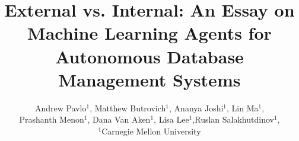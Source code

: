 \documentclass[11pt,times]{article}
\begin{document}
\newcommand{\mail}[1]{\href{mailto:#1}{#1}}

\title{External vs. Internal: An Essay on Machine Learning Agents for Autonomous Database Management Systems}

\author{Andrew Pavlo\(^1\), Matthew Butrovich\(^1\), Ananya Joshi\(^1\), Lin Ma\(^1\),\\ Prashanth Menon\(^1\), Dana Van Aken\(^1\), Lisa Lee\(^1\),Ruslan Salakhutdinov\(^1\),\\
\(^1\)Carnegie Mellon University}

\maketitle
\end{document}
